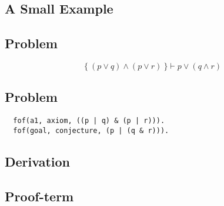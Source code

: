 \documentclass[../main.tex]{subfiles}
\begin{document}
\begin{subappendices}
\section{A Small Example}
\label{appendix}

\subsection{\CPL Problem}

\begin{equation*}
\{\ (p ∨ q) ∧ (p ∨ r)\ \} \vdash p ∨ (q ∧ r)
\end{equation*}

\subsection{\TPTP Problem}

\begin{verbatim}
  fof(a1, axiom, ((p | q) & (p | r))).
  fof(goal, conjecture, (p | (q & r))).
\end{verbatim}

\subsection{\Metis \TSTP Derivation}


\subsection{\Agda Proof-term}

\end{subappendices}
\end{document}
